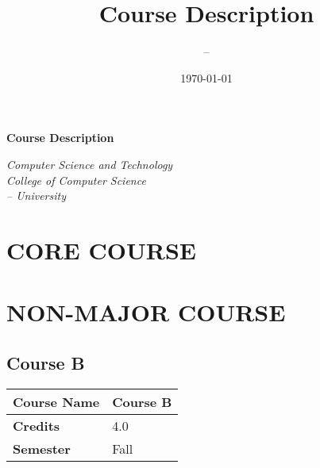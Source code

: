 \documentclass{article}
\title{Course Description}
\author{--}
\date{\today}
\newcommand{\majorname}{Computer Science and Technology}
\newcommand{\collegename}{College of Computer Science}
\newcommand{\universityname}{-- University}
\begin{document}
\begin{titlepage}
 \centering
 \vspace*{4cm}
 \Huge \textbf{Course Description} \\
 \vspace{10cm}
 \begin{flushright}
  \emph{\Large\majorname}\\
  \vspace{0.1cm}
  \emph{\Large\collegename}\\
  \vspace{0.1cm}
  \emph{\Large\universityname}
 \end{flushright}
\end{titlepage}

\clearpage
\setcounter{page}{1}
\tableofcontents %
\clearpage

\pagestyle{fancy} %

\section{CORE COURSE}


% 

\clearpage

\section{NON-MAJOR COURSE}

\subsection{Course B}
\renewcommand{\arraystretch}{1.5} %
\begin{longtable}{|p{3cm}|p{10cm}|}

\hline%
\textbf{Course Name} & 
Course B
\\\hline%
\textbf{Credits} & 
4.0 
\\\hline%
\textbf{Semester} & 
Fall 
\\\hline%

\end{longtable}



\clearpage
\end{document}
